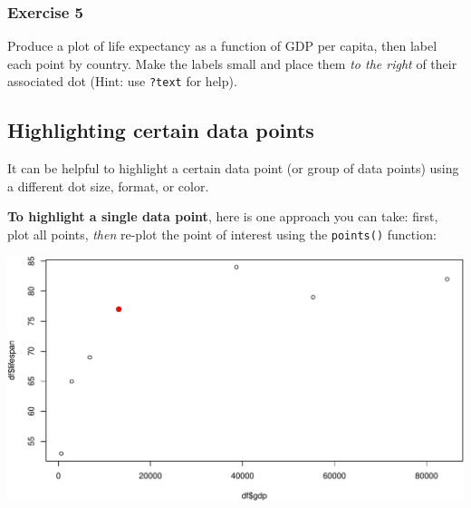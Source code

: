 \documentclass[
]{book}
\newenvironment{Shaded}{\begin{snugshade}}{\end{snugshade}}
\newcommand{\DataTypeTok}[1]{\textcolor[rgb]{0.13,0.29,0.53}{#1}}
\newcommand{\DecValTok}[1]{\textcolor[rgb]{0.00,0.00,0.81}{#1}}
\newcommand{\FloatTok}[1]{\textcolor[rgb]{0.00,0.00,0.81}{#1}}
\newcommand{\KeywordTok}[1]{\textcolor[rgb]{0.13,0.29,0.53}{\textbf{#1}}}
\newcommand{\NormalTok}[1]{#1}
\newcommand{\OperatorTok}[1]{\textcolor[rgb]{0.81,0.36,0.00}{\textbf{#1}}}
\newcommand{\StringTok}[1]{\textcolor[rgb]{0.31,0.60,0.02}{#1}}
\begin{document}
\hypertarget{exercise-5-1}{%
\subsubsection*{Exercise 5}\label{exercise-5-1}}

Produce a plot of life expectancy as a function of GDP per capita, then label each point by country. Make the labels small and place them \emph{to the right} of their associated dot (Hint: use \texttt{?text} for help).

\hypertarget{highlighting-certain-data-points}{%
\subsection*{Highlighting certain data points}\label{highlighting-certain-data-points}}

It can be helpful to highlight a certain data point (or group of data points) using a different dot size, format, or color.

\textbf{To highlight a single data point}, here is one approach you can take: first, plot all points, \emph{then} re-plot the point of interest using the \texttt{points()} function:

\begin{Shaded}
\end{Shaded}

\includegraphics{figures/unnamed-chunk-120-1.pdf}
\end{document}
